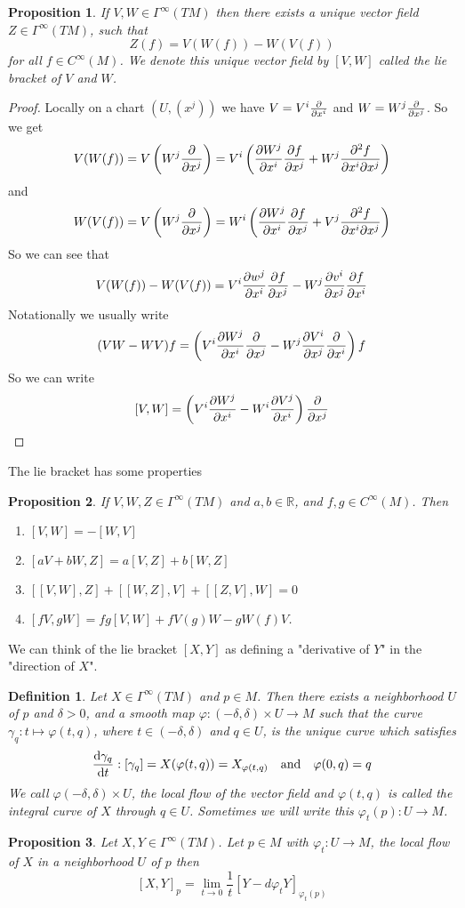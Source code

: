\documentclass[a4paper]{article}
\newtheorem*{prop}{Proposition}
\newtheorem*{defn}{Definition}
\begin{document}
\begin{prop}
  If $V,W \in \Gamma^{\infty}(TM)$ then there exists a unique vector field $Z \in \Gamma^{\infty}(TM)$, such that 
  \[
    Z(f) = V(W(f)) - W(V(f))
  \]
  for all $f \in C^{\infty}(M)$. We denote this unique vector field by $[V,W]$ called the lie bracket of $V$ and $W$.
\end{prop}

\begin{proof}
  Locally on a chart $(U, (x^j))$ we have $V = V^i \pdv{}{x^i}$ and $W = W^j\pdv{}{x^j}$. So we get
  \[
    V(W(f)) = V\left(W^j\pdv{}{x^j}\right) = V^i\left(\pdv{W^j}{x^i} \pdv{f}{x^j} + W^j \frac{\partial^2 f}{\partial x^i \partial x^j} \right)
  \]
  and
  \[
    W(V(f)) = V\left(W^j\pdv{}{x^j}\right) = W^i\left(\pdv{W^j}{x^i} \pdv{f}{x^j} + V^j \frac{\partial^2 f}{\partial x^i \partial x^j} \right)
  \]
  So we can see that
  \[
    V(W(f)) - W(V(f)) =  V^i \pdv{w^j}{x^i} \pdv{f}{x^j} - W^j\pdv{v^i}{x^j}\pdv{f}{x^i}
  \]
  Notationally we usually write
  \[
    \begin{aligned}
      (VW - WV)f &= \left(V^i \pdv{W^j}{x^i} \pdv{}{x^j} - W^j \pdv{V^i}{x^j}\pdv{}{x^i} \right)f \\
    \end{aligned}
  \]
  So we can write
  \[
    [V,W] = \left( V^i \pdv{W^j}{x^i} - W^i \pdv{V^j}{x^i} \right) \pdv{}{x^j}
  \]
\end{proof}
The lie bracket has some properties
\begin{prop}
  If $V,W,Z \in \Gamma^{\infty}(TM)$ and $a,b \in \mathds{R}$, and $f,g \in C^{\infty}(M)$. Then
  \begin{enumerate}
    \item $[V,W] = -[W,V]$ 
    \item $[aV + bW, Z] = a[V,Z] + b[W,Z]$
    \item $[[V,W], Z] + [[W,Z],V] + [[Z,V],W] = 0$
    \item $[fV, gW] = fg[V,W] + fV(g)W - gW(f)V$.
  \end{enumerate}
\end{prop}

We can think of the lie bracket $[X,Y]$ as defining a "derivative of $Y$" in the "direction of $X$". 

\begin{defn}
  Let $X \in \Gamma^{\infty}(TM)$ and $p \in M$. Then there exists a neighborhood $U$ of $p$ and $\delta > 0$, and a smooth map $\varphi: (-\delta, \delta) \times U \rightarrow M$ such that the curve $\gamma_q : t \mapsto \varphi(t,q)$, where $t \in (-\delta, \delta)$ and $q \in U$, is the unique curve which satisfies 
  \[
    \dv{\gamma_q}{t}: [\gamma_q] = X(\varphi(t,q)) = X_{\varphi(t,q)} \quad \text{and} \quad \varphi(0,q) = q
  \]
  We call $\varphi(-\delta, \delta) \times U$, the local flow of the vector field and $\varphi(t,q)$ is called the integral curve of $X$ through $q \in U$. Sometimes we will write this $\varphi_t(p): U \rightarrow M$.
\end{defn}

\begin{prop}
  Let $X,Y \in \Gamma^{\infty}(TM)$. Let $p \in M$ with $\varphi_t: U \rightarrow M$, the local flow of $X$ in a neighborhood $U$ of $p$ then
  \[
    [X,Y]_p = \lim_{t \rightarrow 0} \frac{1}{t} \left[ Y - d \varphi_tY \right]_{\varphi_t(p)}
  \]
\end{prop}
\end{document}
